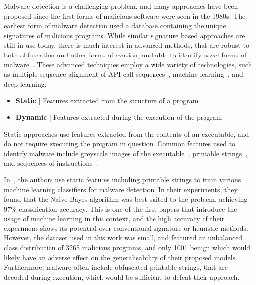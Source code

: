 \documentclass{report}
\begin{document}
Malware detection is a challenging problem, and many approaches have been proposed since the first forms of malicious software were seen in the 1980s. The earliest form of malware detection used a database containing the unique signatures of malicious programs. While similar signature based approaches are still in use today, there is much interest in advanced methods, that are robust to both obfuscation and other forms of evasion, and able to identify novel forms of malware~\citep{m.ComprehensiveSurveyDeep2023,merabetSurveyMalwareDetection2019,aboaojaMalwareDetectionIssues2022,idikamathurSurveyMalwareDetection2007}. These advanced techniques employ a wide variety of technologies, such as multiple sequence alignment of API call sequences~\citep{kiNovelApproachDetect2015}, machine learning~\citep{kambojDetectionMalwareDownloaded2023}, and deep learning.


\begin{itemize}
    \item \textbf{Static} | Features extracted from the structure of a program
    \item \textbf{Dynamic} | Features extracted during the execution of the program
\end{itemize}

Static approaches use features extracted from the contents of an executable, and do not require executing the program in question. Common features used to identify malware include greyscale images of the executable~\citep{niMalwareIdentificationUsing2018,jainConvolutionalNeuralNetworks2020,habibiPerformanceEvaluationCNN2023}, printable strings~\citep{tianAutomatedClassificationSystem2009,singhDetectionMaliciousSoftware2020,schultzDataMiningMethods2001a}, and sequences of instructions~\citep{kakisimSequentialOpcodeEmbeddingbased2022,wangDeepLearningRegularization2021,daremVisualizationDeeplearningbasedMalware2021}. 

In~\cite{schultzDataMiningMethods2001a}, the authors use static features including printable strings to train various machine learning classifiers for malware detection. In their experiments, they found that the Naive Bayes algorithm was best suited to the problem, achieving 97\% classification accuracy. This is one of the first papers that introduce the usage of machine learning in this context, and the high accuracy of their experiment shows its potential over conventional signature or heuristic methods. However, the dataset used in this work was small, and featured an unbalanced class distribution of 3265 malicious programs, and only 1001 benign which would likely have an adverse effect on the generalisability of their proposed models. Furthermore, malware often include obfuscated printable strings, that are decoded during execution, which would be sufficient to defeat their approach. 
\end{document}
